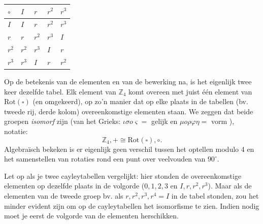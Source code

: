 \begin{multicols}{2}
\begin{center}
\begin{tabel}
\end{tabel}

\begin{tabel}

    \setlength{\extrarowheight}{2pt}

		\begin{tabular}{| C{1cm} | C{1cm}| C{1cm}| C{1cm} |C{1cm}| } 
		\hline
		 $\circ$ & $I$ & $r$ & $r^2$ & $r^3$ \\
			\hline
 			 $I$ & $I$ & $r$ &$r^2$ & $r^3$\\
			 $r$ & $r$ & $r^2$ & $r^3$ &$I$ \\
			 $r^2$ & $r^2$ & $r^3$ & $I$ & $r$ \\
			 $r^3$ & $r^3$ & $I$ & $r$ & $r^2$ \\
			 \hline
		\end{tabular}		
		
\end{tabel}		
\end{center}


    Op de betekenis van de elementen en van de bewerking na, is het eigenlijk twee keer dezelfde tabel. Elk element van $\mathbb{Z}_4$ komt overeen met juist één element van $\text{Rot}(\square)$ (en omgekeerd), op zo'n manier dat op elke plaats in de tabellen (bv. tweede rij, derde kolom) overeenkomstige elementen staan. We zeggen dat beide groepen \emph{isomorf} zijn (van het Grieks: $\iota\sigma o\varsigma=$ gelijk en $\mu o\rho\varphi\eta=$ vorm ), notatie: 
	$$\mathbb{Z}_4, + \cong  \text{Rot}(\square),\circ.$$
	Algebraïsch bekeken is er eigenlijk geen verschil tussen het optellen modulo 4 en het samenstellen van rotaties rond een punt over veelvouden van $90^\circ$.
	
	Let op als je twee cayleytabellen vergelijkt: hier stonden de overeenkomstige elementen op dezelfde plaats in de volgorde ($0, 1, 2, 3$ en $I, r, r^2, r^3$). Maar als de elementen van de tweede groep bv. als $r, r^2, r^3, r^4=I$ in de tabel stonden, zou het minder evident zijn om op de cayleytabellen het isomorfisme te zien. Indien nodig moet je eerst de volgorde van de elementen herschikken.
	
\end{multicols}
	
